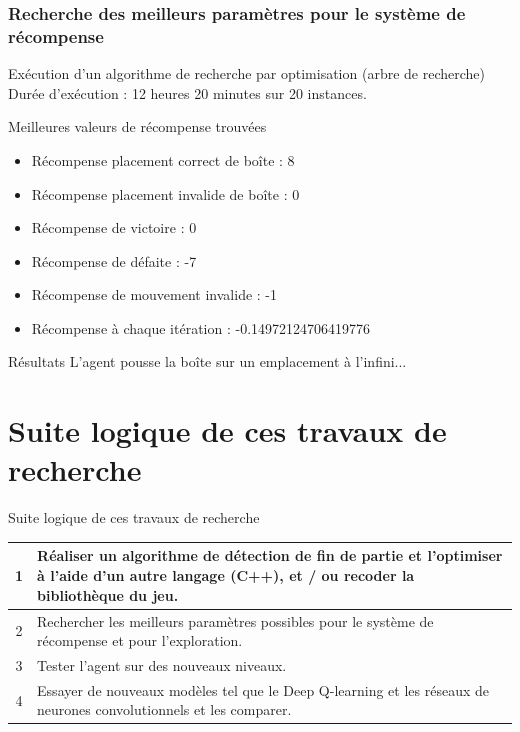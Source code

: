 \documentclass[
	11pt, %
]{beamer}
\begin{document}
\begin{frame}[shrink=10]
    \frametitle{Recherche des meilleurs paramètres pour le système de récompense}
    
    \begin{block}{Exécution d'un algorithme de recherche par optimisation (arbre de recherche)}
        Durée d'exécution : 12 heures 20 minutes sur 20 instances.
    \end{block}
    
    \begin{block}{Meilleures valeurs de récompense trouvées}
        \begin{itemize}
            \item Récompense placement correct de boîte : 8
            \item Récompense placement invalide de boîte : 0
            \item Récompense de victoire : 0
            \item Récompense de défaite : -7
            \item Récompense de mouvement invalide : -1
            \item Récompense à chaque itération : -0.14972124706419776
        \end{itemize}
    \end{block}
    
    \begin{block}{Résultats}
        L'agent pousse la boîte sur un emplacement à l'infini...
    \end{block}
\end{frame}

\section{Suite logique de ces travaux de recherche}

\begin{frame}{Suite logique de ces travaux de recherche}
    \begin{table}
        \centering
        \small
        \begin{tabular}{|c|p{8cm}|}
            \hline
            1 &  Réaliser un algorithme de détection de fin de partie et l'optimiser à l'aide d'un autre langage (C++), et / ou recoder la bibliothèque du jeu.\\
            \hline
            2 &  Rechercher les meilleurs paramètres possibles pour le système de récompense et pour l'exploration.\\
            \hline
            3 & Tester l'agent sur des nouveaux niveaux. \\
            \hline
            4 & Essayer de nouveaux modèles tel que le Deep Q-learning et les réseaux de neurones convolutionnels et les comparer. \\
            \hline
        \end{tabular}
    \end{table}
\end{frame}
\end{document}
